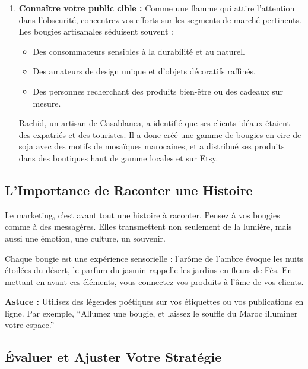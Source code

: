 \documentclass[11pt,fleqn,onecolumn,oneside]{book}
\begin{document}
\begin{enumerate}
    \item \textbf{Connaître votre public cible :} Comme une flamme qui attire l’attention dans l’obscurité, concentrez vos efforts sur les segments de marché pertinents. Les bougies artisanales séduisent souvent :
    \begin{itemize}
        \item Des consommateurs sensibles à la durabilité et au naturel.
        \item Des amateurs de design unique et d’objets décoratifs raffinés.
        \item Des personnes recherchant des produits bien-être ou des cadeaux sur mesure.
    \end{itemize}
    
    \begin{example}
    Rachid, un artisan de Casablanca, a identifié que ses clients idéaux étaient des expatriés et des touristes. Il a donc créé une gamme de bougies en cire de soja avec des motifs de mosaïques marocaines, et a distribué ses produits dans des boutiques haut de gamme locales et sur Etsy.
    \end{example}
\end{enumerate}

\subsection*{L’Importance de Raconter une Histoire}

Le marketing, c’est avant tout une histoire à raconter. Pensez à vos bougies comme à des messagères. Elles transmettent non seulement de la lumière, mais aussi une émotion, une culture, un souvenir. 

\begin{corollary}
Chaque bougie est une expérience sensorielle : l’arôme de l’ambre évoque les nuits étoilées du désert, le parfum du jasmin rappelle les jardins en fleurs de Fès. En mettant en avant ces éléments, vous connectez vos produits à l’âme de vos clients.
\end{corollary}

\begin{remark}
\textbf{Astuce :} Utilisez des légendes poétiques sur vos étiquettes ou vos publications en ligne. Par exemple, ``Allumez une bougie, et laissez le souffle du Maroc illuminer votre espace.''
\end{remark}

\subsection*{Évaluer et Ajuster Votre Stratégie}
\end{document}
